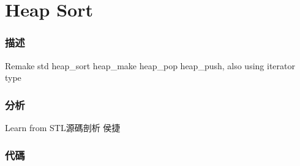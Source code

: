\section{Heap Sort} %
\label{sec:heap-sort}


\subsubsection{描述}
Remake std heap_sort heap_make heap_pop heap_push, also using iterator type


\subsubsection{分析}
Learn from STL源碼剖析 侯捷


\subsubsection{代碼}
